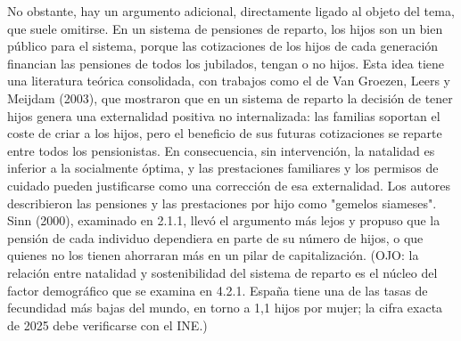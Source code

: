\documentclass[10pt,a4paper]{article}
\begin{document}
No obstante, hay un argumento adicional, directamente ligado al objeto del tema, que suele omitirse. En un sistema de pensiones de reparto, los hijos son un bien público para el sistema, porque las cotizaciones de los hijos de cada generación financian las pensiones de todos los jubilados, tengan o no hijos. Esta idea tiene una literatura teórica consolidada, con trabajos como el de Van Groezen, Leers y Meijdam (2003), que mostraron que en un sistema de reparto la decisión de tener hijos genera una externalidad positiva no internalizada: las familias soportan el coste de criar a los hijos, pero el beneficio de sus futuras cotizaciones se reparte entre todos los pensionistas. En consecuencia, sin intervención, la natalidad es inferior a la socialmente óptima, y las prestaciones familiares y los permisos de cuidado pueden justificarse como una corrección de esa externalidad. Los autores describieron las pensiones y las prestaciones por hijo como "gemelos siameses". Sinn (2000), examinado en 2.1.1, llevó el argumento más lejos y propuso que la pensión de cada individuo dependiera en parte de su número de hijos, o que quienes no los tienen ahorraran más en un pilar de capitalización. (OJO: la relación entre natalidad y sostenibilidad del sistema de reparto es el núcleo del factor demográfico que se examina en 4.2.1. España tiene una de las tasas de fecundidad más bajas del mundo, en torno a 1,1 hijos por mujer; la cifra exacta de 2025 debe verificarse con el INE.)
\end{document}
